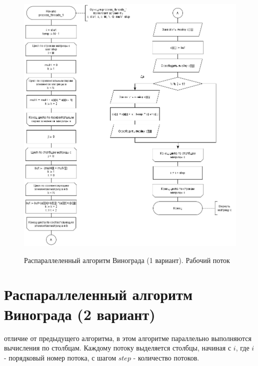 \begin{figure}[pt!]
	\begin{center}
		{\includegraphics[scale = 0.6]{schemes/parall_1_work}}
		\caption{Распараллеленный алгоритм Винограда (1 вариант). Рабочий поток}
		\label{fig3:image}
	\end{center}
\end{figure}

\newpage

\section{Распараллеленный алгоритм Винограда (2 вариант)}
 отличие от предыдущего алгоритма, в этом алгоритме параллельно выполняются вычисления по столбцам. Каждому потоку выделяется столбцы, начиная с $i$, где $i$ - порядковый номер потока, с шагом $step$ - количество потоков.

